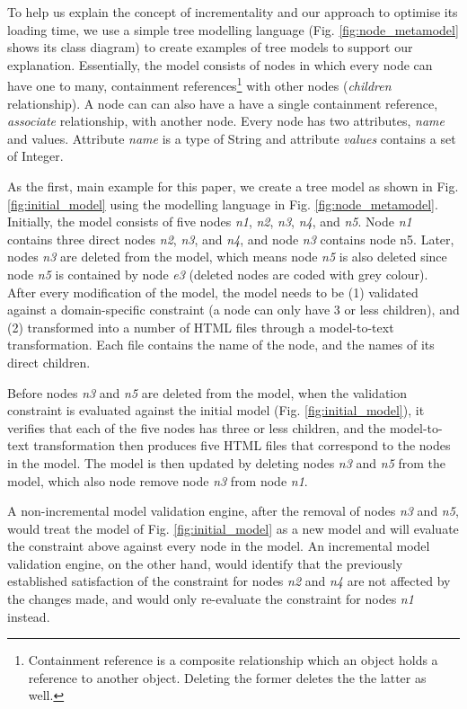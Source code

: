 \documentclass[sigconf]{acmart}
\begin{document}
To help us explain the concept of incrementality and our approach to optimise its loading time, we use a simple tree modelling language (Fig. \ref{fig:node_metamodel} shows its class diagram) to create examples of  tree models to support our explanation. Essentially, the model consists of nodes in which every node can have one to many, containment references\footnote{Containment reference is a composite relationship which an object holds a reference to another object. Deleting the former deletes the the latter as well.} with other nodes (\emph{children} relationship). A node can can also have a have a single containment reference, \emph{associate} relationship, with another node. Every node has two attributes, \emph{name} and {values}. Attribute \emph{name} is a type of String and attribute \emph{values} contains a set of Integer.

As the first, main example for this paper, we create a tree model as shown in Fig. \ref{fig:initial_model} using the modelling language in Fig. \ref{fig:node_metamodel}. Initially, the model consists of five nodes \emph{n1}, \emph{n2}, \emph{n3}, \emph{n4}, and \emph{n5}. Node \emph{n1} contains three direct nodes \emph{n2}, \emph{n3}, and \emph{n4}, and node \emph{n3} contains node {n5}. Later, nodes \emph{n3} are deleted from the model, which means node \emph{n5} is also deleted since node \emph{n5} is contained by node \emph{e3} (deleted nodes are coded with grey colour). After every modification of the model, the model needs to be (1) validated against a domain-specific constraint (a node can only have 3 or less children), and (2) transformed into a number of HTML files through a model-to-text transformation. Each file contains the name of the node, and the names of its direct children.

Before nodes \emph{n3} and \emph{n5} are deleted from the model, when the validation constraint is evaluated against the initial model (Fig. \ref{fig:initial_model}), it verifies that each of the five nodes has three or less children, and the model-to-text transformation then produces five HTML files that correspond to the nodes in the model. The model is then updated by deleting nodes \emph{n3} and \emph{n5} from the model, which also node remove node \emph{n3} from node \emph{n1}. 

A non-incremental model validation engine, after the removal of nodes \emph{n3} and \emph{n5}, would treat the model of Fig. \ref{fig:initial_model} as a new model and will evaluate the constraint above against every node in the model. An incremental model validation engine, on the other hand, would identify that the previously established satisfaction of the constraint for nodes \emph{n2} and \emph{n4} are not affected by the changes made, and would only re-evaluate the constraint for nodes \emph{n1} instead. 
\end{document}
